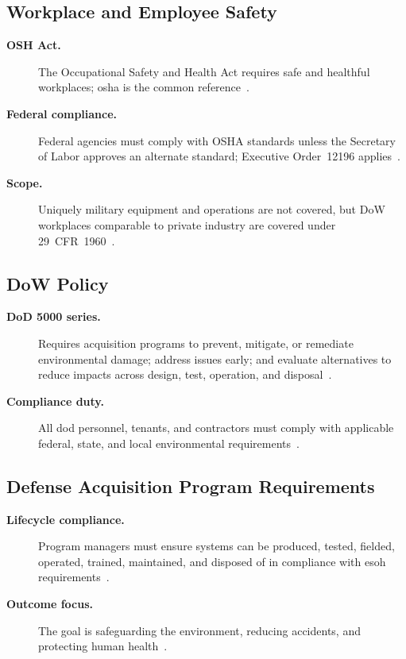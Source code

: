 \documentclass[../main.tex]{subfiles}
\begin{document}
\subsection{Workplace and Employee Safety}
\begin{description}
  \item[\textbf{OSH Act.}] The Occupational Safety and Health Act requires safe and healthful workplaces; \ac{osha} is the common reference~\autocite{edo-3-3-7-environmental-requirements-2025}.
  \item[\textbf{Federal compliance.}] Federal agencies must comply with OSHA standards unless the Secretary of Labor approves an alternate standard; Executive Order~12196 applies~\autocite{edo-3-3-7-environmental-requirements-2025}.
  \item[\textbf{Scope.}] Uniquely military equipment and operations are not covered, but DoW workplaces comparable to private industry are covered under 29~CFR~1960~\autocite{edo-3-3-7-environmental-requirements-2025}.
\end{description}

\subsection{DoW Policy}
\begin{description}
  \item[\textbf{DoD 5000 series.}] Requires acquisition programs to prevent, mitigate, or remediate environmental damage; address issues early; and evaluate alternatives to reduce impacts across design, test, operation, and disposal~\autocite{edo-3-3-7-environmental-requirements-2025}.
  \item[\textbf{Compliance duty.}] All \ac{dod} personnel, tenants, and contractors must comply with applicable federal, state, and local environmental requirements~\autocite{edo-3-3-7-environmental-requirements-2025}.
\end{description}

\subsection{Defense Acquisition Program Requirements}
\begin{description}
  \item[\textbf{Lifecycle compliance.}] Program managers must ensure systems can be produced, tested, fielded, operated, trained, maintained, and disposed of in compliance with \ac{esoh} requirements~\autocite{edo-3-3-7-environmental-requirements-2025}.
  \item[\textbf{Outcome focus.}] The goal is safeguarding the environment, reducing accidents, and protecting human health~\autocite{edo-3-3-7-environmental-requirements-2025}.
\end{description}
\end{document}

